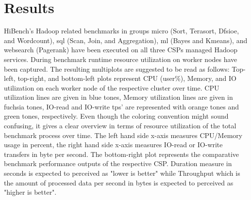 \documentclass[review]{elsarticle}
\begin{document}
\section{Results}
HiBench's Hadoop related benchmarks in groups micro (Sort, Terasort, Dfsioe, and Wordcount), sql (Scan, Join, and Aggregation), ml (Bayes and Kmeans), and websearch (Pagerank) have been executed on all three CSPs managed Hadoop services. During benchmark runtime resource utilization on worker nodes have been captured. The resulting multiplots are suggested to be read as follows: Top-left, top-right, and bottom-left plots represent CPU (user\%), Memory, and IO utilization on each worker node of the respective cluster over time. CPU utilization lines are given in blue tones, Memory utilization lines are given in fuchsia tones, IO-read and IO-write tps' are represented with orange tones and green tones, respectively. Even though the coloring convention might sound confusing, it gives a clear overview in terms of resource utilization of the total benchmark process over time. The left hand side x-axis measures CPU/Memory usage in percent, the right hand side x-axis measures IO-read or IO-write transfers in byte per second. The bottom-right plot represents the comparative benchmark performance outputs of the respective CSP. Duration measure in seconds is expected to perceived as "lower is better" while Throughput which is the amount of processed data per second in bytes is expected to perceived as "higher is better".
\end{document}
